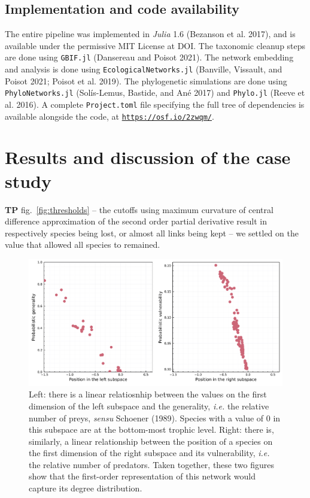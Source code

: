 \documentclass[10pt,oneside]{article}
\makeatletter
\def\maxwidth{\ifdim\Gin@nat@width>\linewidth\linewidth
\else\Gin@nat@width\fi}
\let\Oldincludegraphics\includegraphics
\renewcommand{\includegraphics}[1]{\Oldincludegraphics[width=\maxwidth]{#1}}
\makeatother
\begin{document}
\hypertarget{implementation-and-code-availability}{%
\subsection{Implementation and code
availability}\label{implementation-and-code-availability}}

The entire pipeline was implemented in \emph{Julia} 1.6 (Bezanson et al.
2017), and is available under the permissive MIT License at DOI. The
taxonomic cleanup steps are done using \texttt{GBIF.jl} (Dansereau and
Poisot 2021). The network embedding and analysis is done using
\texttt{EcologicalNetworks.jl} (Banville, Vissault, and Poisot 2021;
Poisot et al. 2019). The phylogenetic simulations are done using
\texttt{PhyloNetworks.jl} (Solís-Lemus, Bastide, and Ané 2017) and
\texttt{Phylo.jl} (Reeve et al. 2016). A complete \texttt{Project.toml}
file specifying the full tree of dependencies is available alongside the
code, at \href{https://osf.io/2zwqm/}{\texttt{https://osf.io/2zwqm/}}.

\hypertarget{results-and-discussion-of-the-case-study}{%
\section{Results and discussion of the case
study}\label{results-and-discussion-of-the-case-study}}

\textbf{TP} fig.~\ref{fig:thresholds} -- the cutoffs using maximum
curvature of central difference approximation of the second order
partial derivative result in respectively species being lost, or almost
all links being kept -- we settled on the value that allowed all species
to remained.

\begin{figure}
\hypertarget{fig:degree}{%
\centering
\includegraphics{figures/figure-degree.png}
\caption{Left: there is a linear relatiosnhip between the values on the
first dimension of the left subspace and the generality, \emph{i.e.} the
relative number of preys, \emph{sensu} Schoener (1989). Species with a
value of 0 in this subspace are at the bottom-most trophic level. Right:
there is, similarly, a linear relationship between the position of a
species on the first dimension of the right subspace and its
vulnerability, \emph{i.e.} the relative number of predators. Taken
together, these two figures show that the first-order representation of
this network would capture its degree distribution.}\label{fig:degree}
}
\end{figure}
\end{document}
